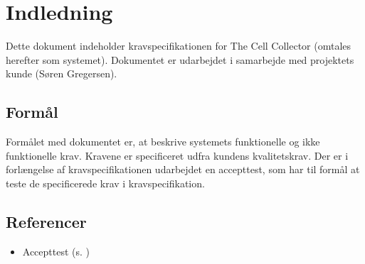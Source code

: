\section{Indledning}
Dette dokument indeholder kravspecifikationen for The Cell Collector (omtales herefter som systemet). Dokumentet er udarbejdet i samarbejde med projektets kunde (Søren Gregersen). 
\subsection{Formål}
Formålet med dokumentet er, at beskrive systemets funktionelle og ikke funktionelle krav. Kravene er specificeret udfra kundens kvalitetskrav. Der er i forlængelse af kravspecifikationen udarbejdet en accepttest, som har til formål at teste de specificerede krav i kravspecifikation.
\subsection{Referencer}
\begin{itemize}
\item Accepttest (s. \pageref{ch:at})
\end{itemize}

